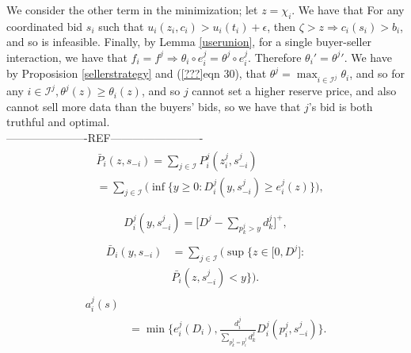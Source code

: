 \documentclass[12pt]{article}
\theoremstyle{definition}
\newcommand{\mcI}{\mathcal{I}}
\begin{document}
\begin{multicols}{2}
We consider the other term in the minimization; let $z=\chi_i$. We have that
For any coordinated bid $s_i$ such that $u_i(z_i, c_i) > u_i(t_i)+
\epsilon$, then $\zeta > z
\Rightarrow c_i(s_{i}) > b_i$, and so is infeasible. 
Finally, by Lemma \ref{userunion}, for a single buyer-seller interaction, we
have that $f_i = f^j \Rightarrow \theta_i \circ e_i^j = \theta^j \circ e_i^j$.
Therefore $\theta_i' = {\theta^j}'$. We have by Proposision
\ref{sellerstrategy} and (\ref{???}eqn 30), that $\theta^j = \max_{i\in\mcI^j}
\theta_i$, and so for any $i\in\mcI^j, \theta^j(z) \ge \theta_i(z)$, and so $j$
cannot set a higher reserve price, and also cannot sell more data than the buyers'
bids, so we have that $j$'s bid is both truthful and optimal.
\\----------------------REF-------------------------\\
\begin{align}\label{dataprice}
\begin{split}
    &\bar{P}_i(z, s_{-i}) =\displaystyle\sum_{j\in\mcI}P_i^j(z_i^j,
s_{-i}^j) \\
    &= \sum_{j\in\mcI}\bigg(\inf\bigg\lbrace y\ge 0 : 
    {D_i^j}(y,s_{-i}^j) \ge e_i^j(z) \bigg\rbrace \bigg),\\
\end{split}
\end{align}
\begin{align}
\begin{split}\label{datacomposed}
    D_i^j(y,s_{-i}^j) = \bigg\lbrack D^j - \sum_{p_k^j> y} d_k^j\bigg\rbrack^+,
\end{split}
\end{align}
\begin{align}\label{datapriceinverse}
\begin{split}
    \bar{D}_i(y, s_{-i}) &= \displaystyle\sum_{j\in\mcI}\bigg(\sup\bigg\lbrace z\in \big[ 0,
    D^j \big] : \\
    &\bar{P_i}(z,s_{-i}^j) < y\bigg\rbrace\bigg).
\end{split}
\end{align}
\begin{align}\label{dataallocation}
    a_i^j(s) \\
    &= \min\bigg\lbrace e_i^j(D_i),
    \frac{d_i^j}{\sum_{p_k^j= p_i^j}d_k^j} D_i^j(p_i^j,s_{-i}^j)\bigg\rbrace.
\end{align}
\begin{align}\label{datacost}

\end{align}
\end{multicols}
\end{document}
